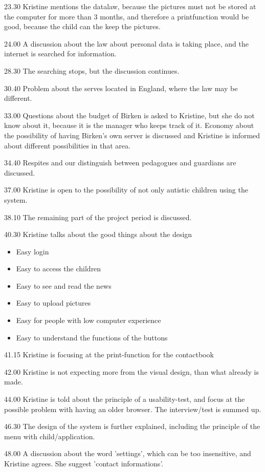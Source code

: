23.30
Kristine mentions the datalaw, because the pictures must not be stored at the computer for more than 3 months, and therefore a printfunction would be good, because the child can the keep the pictures.

24.00
A discussion about the law about personal data is taking place, and the internet is searched for information.

28.30
The searching stops, but the discussion continues.

30.40
Problem about the serves located in England, where the law may be different.

33.00
Questions about the budget of Birken is asked to Kristine, but she do not know about it, because it is the manager who keeps track of it. Economy about the possibility of having Birken's own server is discussed and Kristine is informed about different possibilities in that area.

34.40
Respites and our distinguish between pedagogues and guardians are discussed.

37.00
Kristine is open to the possibility of not only autistic children using the system.

38.10
The remaining part of the project period is discussed.

40.30
Kristine talks about the good things about the design
\begin{itemize}
\item{Easy login}
\item{Easy to access the children}
\item{Easy to see and read the news}
\item{Easy to upload pictures}
\item{Easy for people with low computer experience}
\item{Easy to understand the functions of the buttons}
\end{itemize}

41.15
Kristine is focusing at the print-function for the contactbook

42.00
Kristine is not expecting more from the visual design, than what already is made.

44.00
Kristine is told about the principle of a usability-test, and focus at the possible problem with having an older browser.
The interview/test is summed up.

46.30
The design of the system is further explained, including the principle of the menu with child/application.

48.00
A discussion about the word 'settings', which can be too insensitive, and Kristine agrees. She suggest 'contact informations'.

